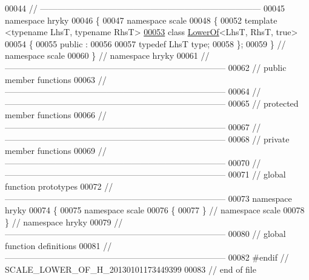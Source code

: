 \begin{DoxyCode}
00044 \textcolor{comment}{//
      ------------------------------------------------------------------------------}
00045 \textcolor{keyword}{namespace }hryky
00046 \{
00047 \textcolor{keyword}{namespace }scale
00048 \{
00052 \textcolor{keyword}{template} <\textcolor{keyword}{typename} LhsT, \textcolor{keyword}{typename} RhsT>
\hypertarget{scale__lower__of_8h_source_l00053}{}\hyperlink{classhryky_1_1scale_1_1_lower_of_3_01_lhs_t_00_01_rhs_t_00_01true_01_4}{00053} \textcolor{keyword}{class }\hyperlink{classhryky_1_1scale_1_1_lower_of}{LowerOf}<LhsT, RhsT, true>
00054 \{
00055 \textcolor{keyword}{public} :
00056 
00057     \textcolor{keyword}{typedef} LhsT type;
00058 \};
00059 \} \textcolor{comment}{// namespace scale}
00060 \} \textcolor{comment}{// namespace hryky}
00061 \textcolor{comment}{//
      ------------------------------------------------------------------------------}
00062 \textcolor{comment}{// public member functions}
00063 \textcolor{comment}{//
      ------------------------------------------------------------------------------}
00064 \textcolor{comment}{//
      ------------------------------------------------------------------------------}
00065 \textcolor{comment}{// protected member functions}
00066 \textcolor{comment}{//
      ------------------------------------------------------------------------------}
00067 \textcolor{comment}{//
      ------------------------------------------------------------------------------}
00068 \textcolor{comment}{// private member functions}
00069 \textcolor{comment}{//
      ------------------------------------------------------------------------------}
00070 \textcolor{comment}{//
      ------------------------------------------------------------------------------}
00071 \textcolor{comment}{// global function prototypes}
00072 \textcolor{comment}{//
      ------------------------------------------------------------------------------}
00073 \textcolor{keyword}{namespace }hryky
00074 \{
00075 \textcolor{keyword}{namespace }scale
00076 \{
00077 \} \textcolor{comment}{// namespace scale}
00078 \} \textcolor{comment}{// namespace hryky}
00079 \textcolor{comment}{//
      ------------------------------------------------------------------------------}
00080 \textcolor{comment}{// global function definitions}
00081 \textcolor{comment}{//
      ------------------------------------------------------------------------------}
00082 \textcolor{preprocessor}{#endif // SCALE\_LOWER\_OF\_H\_20130101173449399}
00083 \textcolor{preprocessor}{}\textcolor{comment}{// end of file}
\end{DoxyCode}
